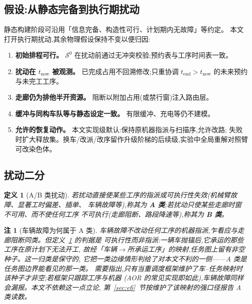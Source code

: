 \documentclass[manuscript,screen,review]{acmart}
\newtheorem{definition}{定义}
\newtheorem{remark}{注}
\begin{document}
\subsection{假设:从静态完备到执行期扰动}
\label{sec:assumptions}

静态构建阶段可沿用「信息完备、构造性可行、计划期内无故障」等约定。
本文打开执行期扰动,其余物理假设保持不变以便归因:

\begin{enumerate}[label=\textbf{A\arabic*.},leftmargin=*,topsep=2pt,itemsep=2pt]
\item \textbf{初始排程可行。} \(\mathcal{S}^0\) 在扰动前通过无冲突校验;预约表与工序时间表一致。
\item \textbf{扰动在 \(t_{\mathrm{now}}\) 被观测。} 已完成占用不回溯修改;只重协调
\(t_{\mathrm{end}}>t_{\mathrm{now}}\) 的未来预约与未完工工序。
\item \textbf{走廊仍为排他半开资源。} 阻断以附加占用(或禁行窗)注入路由层。
\item \textbf{缓冲与同构车队等与静态设定一致。} 有限缓冲、充电等仍不建模。
\item \textbf{允许的恢复动作。} 本文实现级默认:保持原机器指派与扫描序,允许改路;
失败时扩大释放集。换车/改派/改序留作升级阶梯的后续级,实验中全局重解对照臂可改染色体。
\end{enumerate}

\subsection{扰动二分}
\label{sec:disturbance_classes}

\begin{definition}[A/B 类扰动]
\label{def:ab}
若扰动直接使某些工序的指派或\emph{可执行性}失效(机械臂故障、显著工时偏差、插单、
车辆故障等),称其为 \textbf{A 类};若扰动只使某些走廊时窗不可用、而不使任何工序
不可执行(走廊阻断、路段降速等),称其为 \textbf{B 类}。
\end{definition}

\begin{remark}[车辆故障为何属于 A 类]
\label{rem:agv_class}
车辆故障不改动任何工序的机器指派,乍看应与走廊阻断同类。但定义~\ref{def:ab} 的判据是
\emph{可执行性}而非指派:一辆车抛锚后,它承运的那些工序在原计划下无法开工,
故经「车辆\(\to\)所承运工序」的映射,任务图上留有非空种子。这一归类是保守的,
它把一类边缘情形判给了对本文\emph{不利}的一侧——A 类是任务图边界能看见的那一类。
需要指出,只有当重调度框架维护了车--任务映射时该种子才非空;若框架只跟踪工序与机器
(AOR 的常见实现即如此),车辆故障同样会漏报。本文不依赖这一点立论,
第~\ref{sec:e6}~节按维护了该映射的强口径报告 A 类读数。
\end{remark}
\end{document}
